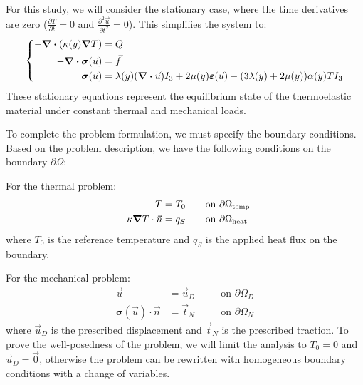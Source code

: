 \documentclass[a4paper,12pt,twoside]{report}
\begin{document}
For this study, we will consider the stationary case, where the time derivatives are zero ($\frac{\partial T}{\partial t} = 0$ and $\frac{\partial^2 \vec u}{\partial t^2} = 0$). This simplifies the system to:
\begin{equation*}
	\left\{
	\begin{aligned}
		- \div (\kappa(y) \grad T) &= Q \\
		- \div \boldsymbol{\sigma}(\vec u) &= \vec f \\
		\boldsymbol{\sigma}(\vec u) &= \lambda(y) (\div \vec u) I_3 + 2\mu(y) \boldsymbol{\varepsilon}(\vec u) - (3\lambda(y) + 2\mu(y)) \alpha(y) T I_3 
	\end{aligned}
	\right.
\end{equation*}
These stationary equations represent the equilibrium state of the thermoelastic material under constant thermal and mechanical loads.

To complete the problem formulation, we must specify the boundary conditions. Based on the problem description, we have the following conditions on the boundary $\partial\Omega$:

For the thermal problem:
\begin{align}
	T &= T_0 \quad &&\text{on } \partial\Omega_{\text{temp}} \label{eq:bc_temp_dirichlet_thermoelastic} \\
	- \kappa \grad T \cdot \vec n &= q_S \quad &&\text{on } \partial\Omega_{\text{heat}} \label{eq:bc_temp_neumann_thermoelastic}
\end{align}
where $T_0$ is the reference temperature and $q_S$ is the applied heat flux on the boundary.

For the mechanical problem:
\begin{align}
	\vec u &= \vec u_D \quad &&\text{on } \partial\Omega_D \label{eq:bc_disp_dirichlet_thermoelastic} \\
	\boldsymbol{\sigma}(\vec u) \cdot \vec n &= \vec t_N \quad &&\text{on } \partial\Omega_N \label{eq:bc_disp_neumann_thermoelastic}
\end{align}
where $\vec u_D$ is the prescribed displacement and $\vec t_N$ is the prescribed traction. 
To prove the well-posedness of the problem, we will limit the analysis to $T_0 = 0$ and $\vec u_D = \vec 0$, otherwise the problem can be rewritten with homogeneous boundary conditions with a change of variables.
 
\end{document}
